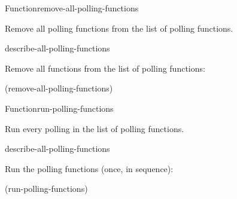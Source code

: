 \documentclass[10pt,twoside,english,pdftex]{article}
\begin{document}

\begin{functiondoc}{Function}{remove-all-polling-functions}{\noargs}
%

\fnsyntax 

\fnpurpose Remove all polling functions from the list of polling functions.

\fnpackage {}

\fnmodule {}

\begin{alsos}{describe-all-polling-functions}
\end{alsos}

\fnexample
Remove all functions from the list of polling functions:
%
\W\supp
\begin{example}
  (remove-all-polling-functions)
\end{example}

\end{functiondoc}


\begin{functiondoc}{Function}{run-polling-functions}{\noargs}
%

\fnsyntax 

\fnpurpose Run every polling  in the list of polling functions.

\fnpackage {}

\fnmodule {}

\begin{alsos}{describe-all-polling-functions}
\end{alsos}

\fnexample
Run the polling functions (once, in sequence):
%
\W\supp
\begin{example}
  (run-polling-functions)
\end{example}

%
%

\fnnote \pollingnote

\end{functiondoc}
\end{document}
